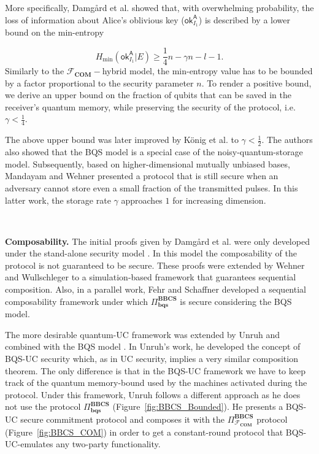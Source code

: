More specifically, Damg{\aa}rd et al. \cite{DFRSS07} showed that, with overwhelming probability, the loss of information about Alice's oblivious key ($\mathsf{ok}^{\mathsf{A}}_{I_{1}}$) is described by a lower bound on the min-entropy \cite{F10}

$$H_{\text{min}}(\mathsf{ok}^{\mathsf{A}}_{I_{1}} | E) \geq 
\frac{1}{4}n - \gamma n - l - 1.$$
Similarly to the $\mathcal{F}_{\textbf{COM}}-$hybrid model, the min-entropy value has to be bounded by a factor proportional to the security parameter $n$. To render a positive bound, we derive an upper bound on the fraction of qubits that can be saved in the receiver's quantum memory, while preserving the security of the protocol, i.e. $\gamma < \frac{1}{4}$. 

The above upper bound was later improved by K\"onig et al. \cite{KWW12} to $\gamma < \frac{1}{2}$. The authors also showed that the BQS model is a special case of the noisy-quantum-storage model. Subsequently, based on higher-dimensional mutually unbiased bases, Mandayam and Wehner \cite{MW11} presented a protocol that is still secure when an adversary cannot store even a small fraction of the transmitted pulses. In this latter work, the storage rate $\gamma$ approaches $1$ for increasing dimension.

\

\noindent\textbf{Composability.} The initial proofs given by Damg{\aa}rd et al. \cite{DFSS05, DFRSS07} were only developed under the stand-alone security model \cite{WW08}. In this model the composability of the protocol is not guaranteed to be secure. These proofs were extended by Wehner and Wullschleger \cite{WW08} to a simulation-based framework that guarantees sequential composition. Also, in a parallel work, Fehr and Schaffner developed a sequential composability framework under which $\Pi^{\textbf{BBCS}}_{\textbf{bqs}}$ is secure considering the BQS model. 

The more desirable quantum-UC framework was extended by Unruh and combined with the BQS model \cite{U11}. In Unruh's work, he developed the concept of BQS-UC security which, as in UC security, implies a very similar composition theorem. The only difference is that in the BQS-UC framework we have to keep track of the quantum memory-bound used by the machines activated during the protocol. Under this framework, Unruh follows a different approach as he does not use the protocol $\Pi^{\textbf{BBCS}}_{\textbf{bqs}}$ (Figure~\ref{fig:BBCS_Bounded}). He presents a BQS-UC secure commitment protocol and composes it with the $\Pi^{\textbf{BBCS}}_{\mathcal{F}_{\textbf{COM}}}$ protocol (Figure~\ref{fig:BBCS_COM}) in order to get a constant-round protocol that BQS-UC-emulates any two-party functionality.


